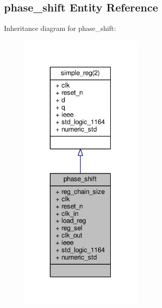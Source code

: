 \subsection{phase\+\_\+shift Entity Reference}
\label{classphase__shift}


Inheritance diagram for phase\+\_\+shift\+:\nopagebreak
\begin{figure}[H]
\begin{center}
\leavevmode
\includegraphics[width=171pt]{d7/d09/classphase__shift__inherit__graph}
\end{center}
\end{figure}


